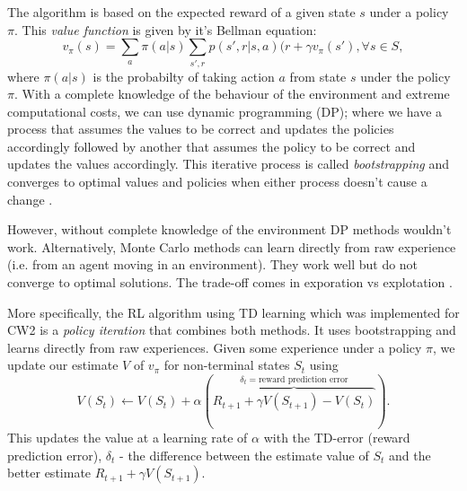 \documentclass[10pt, a4paper]{article}
\begin{document}
The algorithm is based on the expected reward of a given state $s$ under a policy $\pi$. This \textit{value function} is given by it's Bellman equation:
\begin{equation}
	v_\pi(s) = \sum_a \pi(a|s) \sum_{s', r} p(s',r|s,a)(r + \gamma v_\pi(s'), \forall s \in S,
\end{equation}
where $\pi(a|s)$ is the probabilty of taking action $a$ from state $s$ under the policy $\pi$. With a complete knowledge of the behaviour of the environment and extreme computational costs, we can use dynamic programming (DP); where we have a process that assumes the values to be correct and updates the policies accordingly followed by another that assumes the policy to be correct and updates the values accordingly. This iterative process is called \textit{bootstrapping} and converges to optimal values and policies when either process doesn't cause a change \cite[Chapter 4]{sutton1998introduction}.

However, without complete knowledge of the environment DP methods wouldn't work. Alternatively, Monte Carlo methods can learn directly from raw experience (i.e. from an agent moving in an environment). They work well but do not converge to optimal solutions. The trade-off comes in exporation vs explotation \cite[Chapter 5]{sutton1998introduction}.  


More specifically, the RL algorithm using TD learning which was implemented for CW2 is a \textit{policy iteration} that combines both methods. It uses bootstrapping and learns directly from raw experiences. Given some experience under a policy $\pi$, we update our estimate $V$ of $v_\pi$ for non-terminal states $S_t$ using 
\begin{equation}
	V(S_t) \leftarrow V(S_t) + \alpha (\overbrace{R_{t+1} + \gamma V(S_{t+1}) - V(S_t)}^{\delta_t = \textrm{reward prediction error}}).
\end{equation}
This updates the value at a learning rate of $\alpha$ with the TD-error (reward prediction error), $\delta_t$ - the difference between the estimate value of $S_t$ and the better estimate $R_{t+1} + \gamma V(S_{t+1})$.
\end{document}

